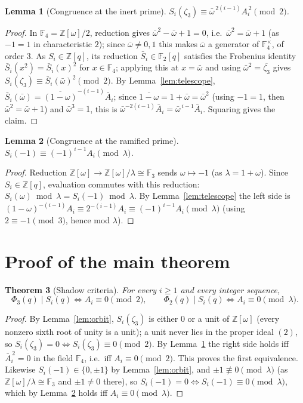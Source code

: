 \documentclass[11pt]{article}
\newtheorem{theorem}{Theorem}[section]
\newtheorem{lemma}[theorem]{Lemma}
\theoremstyle{remark}
\newcommand{\Z}{\mathbb{Z}}
\newcommand{\F}{\mathbb{F}}
\begin{document}
\begin{lemma}[Congruence at the inert prime]\label{lem:mod2}
$S_i(\zeta_3)\equiv\bar\omega^{\,2(i-1)}A_i^{\,2}\pmod{2}$.
\end{lemma}

\begin{proof}
In $\F_4=\Z[\omega]/2$, reduction gives $\bar\omega^2-\bar\omega+1=0$, i.e.\
$\bar\omega^2=\bar\omega+1$ (as $-1=1$ in characteristic $2$); since $\bar\omega\neq0,1$ this
makes $\bar\omega$ a generator of $\F_4^\times$, of order $3$. As $S_i\in\Z[q]$, its reduction
$\bar S_i\in\F_2[q]$ satisfies the Frobenius identity $\bar S_i(x^2)=\bar S_i(x)^2$ for
$x\in\F_4$; applying this at $x=\bar\omega$ and using $\bar\omega^2=\overline{\zeta_3}$ gives
$S_i(\zeta_3)\equiv\bar S_i(\bar\omega)^2\pmod2$. By Lemma~\ref{lem:telescope},
$\bar S_i(\bar\omega)=\overline{(1-\omega)}^{-(i-1)}\bar A_i$; since
$\overline{1-\omega}=1+\bar\omega=\bar\omega^2$ (using $-1=1$, then $\bar\omega^2=\bar\omega+1$)
and $\bar\omega^3=1$, this is $\bar\omega^{-2(i-1)}\bar A_i=\bar\omega^{\,i-1}\bar A_i$. Squaring
gives the claim.
\end{proof}

\begin{lemma}[Congruence at the ramified prime]\label{lem:mod3}
$S_i(-1)\equiv(-1)^{i-1}A_i\pmod{\lambda}$.
\end{lemma}

\begin{proof}
Reduction $\Z[\omega]\to\Z[\omega]/\lambda\cong\F_3$ sends $\omega\mapsto-1$ (as
$\lambda=1+\omega$). Since $S_i\in\Z[q]$, evaluation commutes with this reduction:
$S_i(\omega)\bmod\lambda=S_i(-1)\bmod\lambda$. By Lemma~\ref{lem:telescope} the left side is
$(1-\omega)^{-(i-1)}A_i\equiv2^{-(i-1)}A_i\equiv(-1)^{i-1}A_i\pmod\lambda$ (using $2\equiv-1
\pmod3$, hence mod $\lambda$).
\end{proof}

\section{Proof of the main theorem}

\begin{theorem}[Shadow criteria]\label{thm:shadow}
For every $i\ge1$ and every integer sequence,
\[
\Phi_3(q)\mid S_i(q) \iff A_i\equiv0\pmod2, \qquad
\Phi_2(q)\mid S_i(q) \iff A_i\equiv0\pmod\lambda.
\]
\end{theorem}

\begin{proof}
By Lemma~\ref{lem:orbit}, $S_i(\zeta_3)$ is either $0$ or a unit of $\Z[\omega]$ (every nonzero
sixth root of unity is a unit); a unit never lies in the proper ideal $(2)$, so
$S_i(\zeta_3)=0\iff S_i(\zeta_3)\equiv0\pmod2$. By Lemma~\ref{lem:mod2} the right side holds iff
$\bar A_i^{\,2}=0$ in the field $\F_4$, i.e.\ iff $A_i\equiv0\pmod2$. This proves the first
equivalence. Likewise $S_i(-1)\in\{0,\pm1\}$ by Lemma~\ref{lem:orbit}, and $\pm1\not\equiv0
\pmod\lambda$ (as $\Z[\omega]/\lambda\cong\F_3$ and $\pm1\neq0$ there), so $S_i(-1)=0\iff
S_i(-1)\equiv0\pmod\lambda$, which by Lemma~\ref{lem:mod3} holds iff $A_i\equiv0\pmod\lambda$.
\end{proof}
\end{document}
